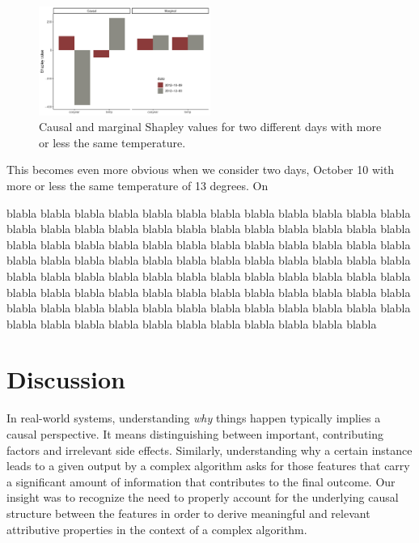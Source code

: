 \documentclass{article}
\newcommand{\comment}[1]{{\color{red} #1}}
\begin{document}
\begin{figure}
	\begin{center}
		\includegraphics[width=0.5\textwidth]{figures/bar_plots.pdf}
	\end{center}
	\caption{Causal and marginal Shapley values for two different days with more or less the same temperature.}
\end{figure}

This becomes even more obvious when we consider two days, October 10 with more or less the same temperature of 13 degrees. On 

blabla blabla blabla blabla blabla blabla blabla blabla blabla blabla blabla blabla blabla blabla blabla blabla blabla blabla blabla blabla blabla blabla blabla blabla blabla blabla blabla blabla blabla blabla blabla blabla blabla blabla blabla blabla blabla blabla blabla blabla blabla blabla blabla blabla blabla blabla blabla blabla blabla blabla blabla blabla blabla blabla blabla blabla blabla blabla blabla blabla blabla blabla blabla blabla blabla blabla blabla blabla blabla blabla blabla blabla blabla blabla blabla blabla blabla blabla blabla blabla blabla blabla blabla blabla blabla blabla blabla blabla blabla blabla blabla blabla blabla blabla blabla 


\section{Discussion}

In real-world systems, understanding {\em why} things happen typically implies a causal perspective. It means distinguishing between important, contributing factors and irrelevant side effects. Similarly, understanding why a certain instance leads to a given output by a complex algorithm asks for those features that carry a significant amount of information that contributes to the final outcome. Our insight was to recognize the need to properly account for the underlying causal structure between the features in order to derive meaningful and relevant attributive properties in the context of a complex algorithm.
\end{document}
